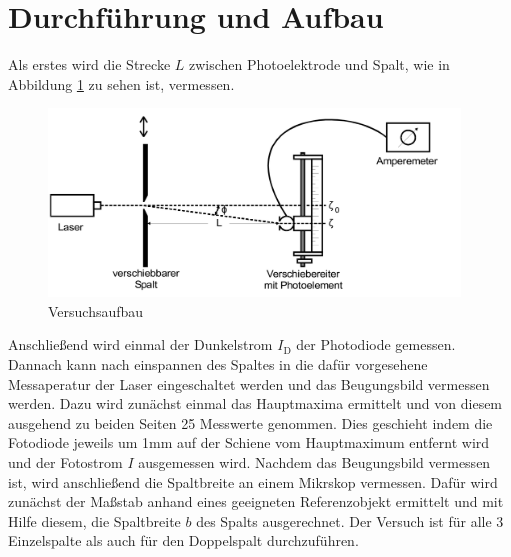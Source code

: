 \section{Durchführung und Aufbau}
\label{sec:Durchführung}
Als erstes wird die Strecke $L$ zwischen Photoelektrode und Spalt, wie in Abbildung \ref{fig:aufbau} zu sehen ist, vermessen.
\begin{figure}
  \centering
  \includegraphics[height=5cm]{picture/Aufbau.png}
  \caption{Versuchsaufbau}
  \label{fig:aufbau}
\end{figure}
Anschließend wird einmal der Dunkelstrom $I_\text{D}$ der Photodiode gemessen. Dannach kann nach einspannen des Spaltes in die dafür vorgesehene Messaperatur der Laser eingeschaltet werden und das Beugungsbild vermessen werden. Dazu wird zunächst einmal das Hauptmaxima ermittelt und von diesem ausgehend zu beiden Seiten 25 Messwerte genommen. Dies geschieht indem die Fotodiode jeweils um 1mm auf der Schiene vom Hauptmaximum entfernt wird und der Fotostrom $I$ ausgemessen wird.
Nachdem das Beugungsbild vermessen ist, wird anschließend die Spaltbreite an einem Mikrskop vermessen. Dafür wird zunächst der Maßstab anhand eines geeigneten Referenzobjekt ermittelt und mit Hilfe diesem, die Spaltbreite $b$ des Spalts ausgerechnet. Der Versuch ist für alle 3 Einzelspalte als auch für den Doppelspalt durchzuführen.
